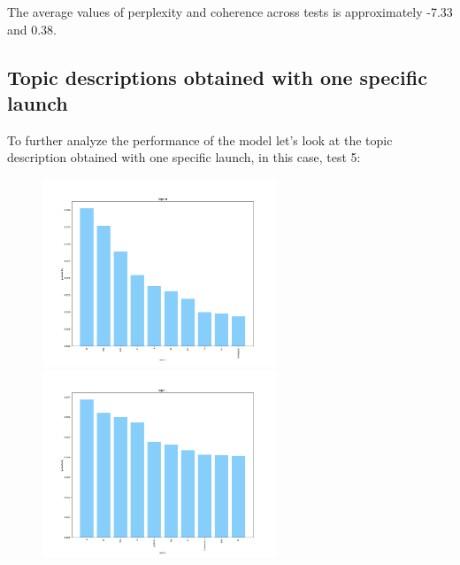 \documentclass[10pt]{article} %
\begin{document}
	The average values of perplexity and coherence across tests is approximately -7.33 and 0.38. 
	
	\subsection{Topic descriptions obtained with one specific launch}
	
	To further analyze the performance of the model let's look at the topic description obtained with one specific launch, in this case, test 5:

	\begin{figure}[H]
		\centering
		\includegraphics[width=7cm]{images/plots/test_5/topic_0.png}
		\includegraphics[width=7cm]{images/plots/test_5/topic_1.png}
	\end{figure}
\end{document}
